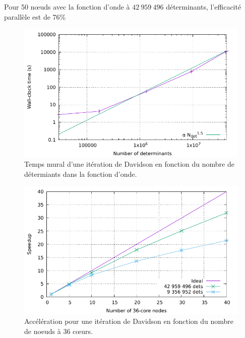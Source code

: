\documentclass[./thesis.tex]{subfiles}
\begin{document}
Pour 50 nœuds avec la fonction d'onde à $42~959~496$ déterminants, l'efficacité parallèle est de 76\%

\begin{figure}[h!]
    \begin{center}
      \includegraphics[width=0.80\columnwidth]{figures/perf/scaling_davidson_ndet}
      \caption{Temps mural d'une itération de Davidson en fonction du nombre de détermiants dans la fonction d'onde.}
      \label{fig:speedup_davidson_ndet_fr}
    \end{center}
\end{figure}
\begin{figure}[h!]
    \begin{center}
      \includegraphics[width=0.80\columnwidth]{figures/perf/scaling_davidson}
      \caption{Accélération pour une itération de Davidson en fonction du nombre de noeuds à 36 cœurs.}
      \label{fig:speedup_davidson_fr}
    \end{center}
\end{figure}
\end{document}
